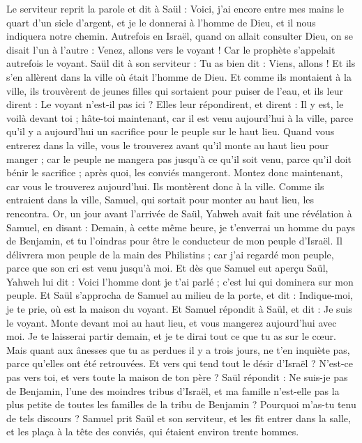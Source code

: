 \begin{multicols}{2}
Le serviteur reprit la parole et dit à Saül : Voici, j'ai encore entre mes mains le quart d'un sicle d'argent, et je le donnerai à l'homme de Dieu, et il nous indiquera notre chemin.
Autrefois en Israël, quand on allait consulter Dieu, on se disait l'un à l'autre : Venez, allons vers le voyant ! Car le prophète s'appelait autrefois le voyant.
Saül dit à son serviteur : Tu as bien dit : Viens, allons ! Et ils s'en allèrent dans la ville où était l'homme de Dieu.
Et comme ils montaient à la ville, ils trouvèrent de jeunes filles qui sortaient pour puiser de l'eau, et ils leur dirent : Le voyant n'est-il pas ici ?
Elles leur répondirent, et dirent : Il y est, le voilà devant toi ; hâte-toi maintenant, car il est venu aujourd'hui à la ville, parce qu'il y a aujourd'hui un sacrifice pour le peuple sur le haut lieu.
Quand vous entrerez dans la ville, vous le trouverez avant qu'il monte au haut lieu pour manger ; car le peuple ne mangera pas jusqu'à ce qu'il soit venu, parce qu'il doit bénir le sacrifice ; après quoi, les conviés mangeront. Montez donc maintenant, car vous le trouverez aujourd'hui.
Ils montèrent donc à la ville. Comme ils entraient dans la ville, Samuel, qui sortait pour monter au haut lieu, les rencontra.
Or, un jour avant l'arrivée de Saül, Yahweh avait fait une révélation à Samuel, en disant :
Demain, à cette même heure, je t'enverrai un homme du pays de Benjamin, et tu l'oindras pour être le conducteur de mon peuple d'Israël. Il délivrera mon peuple de la main des Philistins ; car j'ai regardé mon peuple, parce que son cri est venu jusqu'à moi.
Et dès que Samuel eut aperçu Saül, Yahweh lui dit : Voici l'homme dont je t'ai parlé ; c'est lui qui dominera sur mon peuple.
Et Saül s'approcha de Samuel au milieu de la porte, et dit : Indique-moi, je te prie, où est la maison du voyant.
Et Samuel répondit à Saül, et dit : Je suis le voyant. Monte devant moi au haut lieu, et vous mangerez aujourd'hui avec moi. Je te laisserai partir demain, et je te dirai tout ce que tu as sur le cœur.
Mais quant aux ânesses que tu as perdues il y a trois jours, ne t'en inquiète pas, parce qu'elles ont été retrouvées. Et vers qui tend tout le désir d'Israël ? N'est-ce pas vers toi, et vers toute la maison de ton père ?
Saül répondit : Ne suis-je pas de Benjamin, l'une des moindres tribus d'Israël, et ma famille n'est-elle pas la plus petite de toutes les familles de la tribu de Benjamin ? Pourquoi m'as-tu tenu de tels discours ?
Samuel prit Saül et son serviteur, et les fit entrer dans la salle, et les plaça à la tête des conviés, qui étaient environ trente hommes.

\end{multicols}
